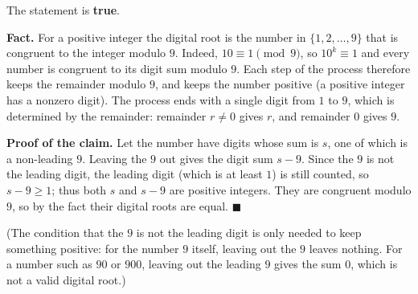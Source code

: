 The statement is \textbf{true}.

\textbf{Fact.} For a positive integer the digital root is the number in $\{1,2,\dots,9\}$ that is congruent to the integer modulo $9$. Indeed, $10\equiv1\pmod 9$, so $10^k\equiv1$ and every number is congruent to its digit sum modulo $9$. Each step of the process therefore keeps the remainder modulo $9$, and keeps the number positive (a positive integer has a nonzero digit). The process ends with a single digit from $1$ to $9$, which is determined by the remainder: remainder $r\ne0$ gives $r$, and remainder $0$ gives $9$.

\textbf{Proof of the claim.} Let the number have digits whose sum is $s$, one of which is a non-leading $9$. Leaving the $9$ out gives the digit sum $s-9$. Since the $9$ is not the leading digit, the leading digit (which is at least $1$) is still counted, so $s-9\ge1$; thus both $s$ and $s-9$ are positive integers. They are congruent modulo $9$, so by the fact their digital roots are equal. $\blacksquare$

(The condition that the $9$ is not the leading digit is only needed to keep something positive: for the number $9$ itself, leaving out the $9$ leaves nothing. For a number such as $90$ or $900$, leaving out the leading $9$ gives the sum $0$, which is not a valid digital root.)
